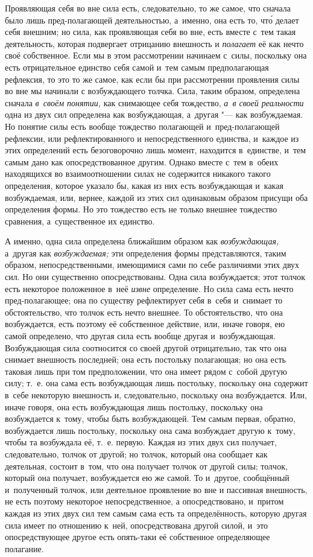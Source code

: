 Проявляющая себя во вне сила есть, следовательно, то же самое, что сначала
было лишь пред-полагающей деятельностью, а~именно, она есть то, чт\'{о} делает
себя внешним; но сила, как проявляющая себя во вне, есть вместе с~тем такая
деятельность, которая подвергает отрицанию внешность и
{\em полагает} её как нечто своё собственное. Если мы в
этом рассмотрении начинаем с~силы, поскольку она есть отрицательное
единство себя самой и~тем самым предполагающая рефлексия, то это то же
самое, как если бы при рассмотрении проявления силы во вне мы начинали с
возбуждающего толчка. Сила, таким образом, определена сначала
{\em в~своём понятии,} как снимающее себя тождество,
{\em а~в своей реальности} одна из двух сил определена
как возбуждающая, а~другая "--- как возбуждаемая. Но понятие силы есть вообще
тождество полагающей и~пред-полагающей рефлексии, или рефлектированного и
непосредственного единства, и~каждое из этих определений есть безоговорочно
лишь момент, находится в~единстве, и~тем самым дано как опосредствованное
другим. Однако вместе с~тем в~обеих находящихся во взаимоотношении силах не
содержится никакого такого определения, которое указало бы, какая из них
есть возбуждающая и~какая возбуждаемая, или, вернее, каждой из этих сил
одинаковым образом присущи оба определения формы. Но это тождество есть не
только внешнее тождество сравнения, а~существенное их единство.

А именно, одна сила определена ближайшим образом как
{\em возбуждающая,} а~другая как {\em возбуждаемая;} эти определения формы
представляются, таким образом, непосредственными, имеющимися сами по себе
различиями этих двух сил. Но они существенно опосредствованы. Одна сила
возбуждается; этот толчок есть некоторое положенное в~неё
{\em извне} определение. Но сила сама есть нечто
пред-полагающее; она по существу рефлектирует себя в~себя и~снимает то
обстоятельство, что толчок есть нечто внешнее. То обстоятельство, что она
возбуждается, есть поэтому её собственное действие, или, иначе говоря, ею
самой определено, что другая сила есть вообще другая и~возбуждающая.
Возбуждающая сила соотносится со своей другой отрицательно, так что она
снимает внешность последней; она есть постольку полагающая; но она есть
таковая лишь при том предположении, что она имеет рядом с~собой другую
силу; т.~е. она сама есть возбуждающая лишь постольку, поскольку она
содержит в~себе некоторую внешность и, следовательно, поскольку она
возбуждается. Или, иначе говоря, она есть возбуждающая лишь постольку,
поскольку она возбуждается к~тому, чтобы быть возбуждающей. Тем самым
первая, обратно, возбуждается лишь постольку, поскольку она сама возбуждает
другую к~тому, чтобы та возбуждала её, т.~е. первую. Каждая из этих двух
сил получает, следовательно, толчок от другой; но толчок, который она
сообщает как деятельная, состоит в~том, что она получает толчок от другой
силы; толчок, который она получает, возбуждается ею же самой. То и~другое,
сообщённый и~полученный толчок, или деятельное проявление во вне и
пассивная внешность, не есть поэтому некоторое непосредственное, а
опосредствовано, и~притом каждая из этих двух сил тем самым сама есть та
определённость, которую другая сила имеет по отношению к~ней,
опосредствована другой силой, и~это опосредствующее другое есть опять-таки
её собственное определяющее полагание.

